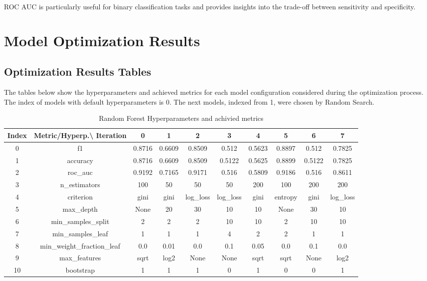 \documentclass{article}%
\begin{document}
                ROC AUC is particularly useful for binary classification tasks and provides insights into the trade-off between sensitivity and specificity.
                

%
\newpage%
\section{Model Optimization Results}%
\label{sec:ModelOptimizationResults}%
\subsection{Optimization Results Tables}%
\label{subsec:OptimizationResultsTables}%
The tables below show the hyperparameters and achieved metrics for each model configuration considered during the optimization process. The index of models with default hyperparameters is 0. The next models, indexed from 1, were chosen by Random Search.%


\begin{table}[h!]%
\caption{Random Forest Hyperparameters and achivied metrics}%
\vspace{0.2cm}%
\centering%
\begin{tabular}{|c||c||c||c||c||c||c||c||c||c|}%
\hline%
Index&Metric/Hyperp.\textbackslash{} Iteration&0&1&2&3&4&5&6&7\\%
\hline%
0&f1&0.8716&0.6609&0.8509&0.512&0.5623&0.8897&0.512&0.7825\\%
1&accuracy&0.8716&0.6609&0.8509&0.5122&0.5625&0.8899&0.5122&0.7825\\%
2&roc\_auc&0.9192&0.7165&0.9171&0.516&0.5809&0.9186&0.516&0.8611\\%
3&n\_estimators&100&50&50&50&200&100&200&200\\%
4&criterion&gini&gini&log\_loss&log\_loss&gini&entropy&gini&log\_loss\\%
5&max\_depth&None&20&30&10&10&None&30&10\\%
6&min\_samples\_split&2&2&2&10&10&2&10&10\\%
7&min\_samples\_leaf&1&1&1&4&2&2&1&1\\%
8&min\_weight\_fraction\_leaf&0.0&0.01&0.0&0.1&0.05&0.0&0.1&0.0\\%
9&max\_features&sqrt&log2&None&None&sqrt&sqrt&None&log2\\%
10&bootstrap&1&1&1&0&1&0&0&1\\%
\hline%
\end{tabular}%
\end{table}
\end{document}
